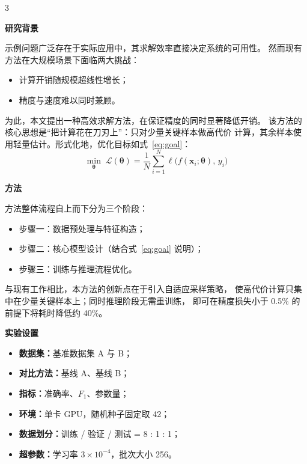 \documentclass[
  a0,                    %
  portrait,              %
]{a0poster}
\renewcommand{\Large}{\fontsize{45}{58}\selectfont}
\newcommand{\vect}[1]{\boldsymbol{#1}}
\newcommand{\postersection}[1]{%
  \vspace{1.2em}
  \noindent\colorbox{primary}{%
    \parbox{\dimexpr\linewidth-2\fboxsep\relax}{%
      \centering\color{white}\heiti\bfseries \Large #1}%
  }
  \vspace{0.8em}
}
\begin{document}
\begin{multicols}{3}

\postersection{研究背景}
示例问题广泛存在于实际应用中，其求解效率直接决定系统的可用性。
然而现有方法在大规模场景下面临两大挑战：
\begin{itemize}
  \item 计算开销随规模超线性增长；
  \item 精度与速度难以同时兼顾。
\end{itemize}
为此，本文提出一种高效求解方法，在保证精度的同时显著降低开销。
该方法的核心思想是“把计算花在刀刃上”：只对少量关键样本做高代价
计算，其余样本使用轻量估计。形式化地，优化目标如式~\eqref{eq:goal}：
\begin{equation}
  \min_{\vect{\theta}} \;
  \mathcal{L}(\vect{\theta}) =
  \frac{1}{N}\sum_{i=1}^{N}
  \ell\bigl(f(\vect{x}_i;\vect{\theta}),\, y_i\bigr)
  \label{eq:goal}
\end{equation}

\postersection{方法}
方法整体流程自上而下分为三个阶段：
\begin{itemize}
  \item 步骤一：数据预处理与特征构造；
  \item 步骤二：核心模型设计（结合式~\eqref{eq:goal} 说明）；
  \item 步骤三：训练与推理流程优化。
\end{itemize}
\begin{center}
\end{center}
\vspace{0.2em}
与现有工作相比，本方法的创新点在于引入自适应采样策略，
使高代价计算只集中在少量关键样本上；同时推理阶段无需重训练，
即可在精度损失小于 0.5\% 的前提下将耗时降低约 40\%。

\postersection{实验设置}
\begin{itemize}
  \item \textbf{数据集：}基准数据集 A 与 B；
  \item \textbf{对比方法：}基线 A、基线 B；
  \item \textbf{指标：}准确率、$F_1$、参数量；
  \item \textbf{环境：}单卡 GPU，随机种子固定取 42；
  \item \textbf{数据划分：}训练 / 验证 / 测试 = 8 : 1 : 1；
  \item \textbf{超参数：}学习率 $3\times10^{-4}$，批次大小 256。
\end{itemize}


\end{multicols}
\end{document}
